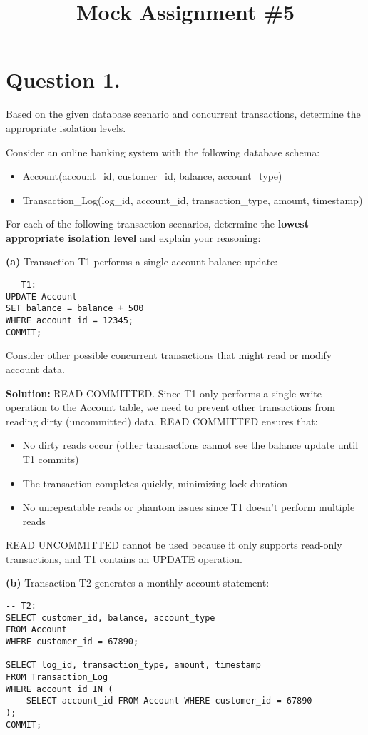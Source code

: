 \documentclass{article}
\title{Mock Assignment \#5}
\author{}
\date{}
\begin{document}
\maketitle

\section*{Question 1.}
Based on the given database scenario and concurrent transactions, determine the appropriate isolation levels.

Consider an online banking system with the following database schema:
\begin{itemize}
    \item Account(account\_id, customer\_id, balance, account\_type)
    \item Transaction\_Log(log\_id, account\_id, transaction\_type, amount, timestamp)
\end{itemize}

For each of the following transaction scenarios, determine the \textbf{lowest appropriate isolation level} and explain your reasoning:

\textbf{(a)} Transaction T1 performs a single account balance update:
\begin{verbatim}
-- T1:
UPDATE Account 
SET balance = balance + 500 
WHERE account_id = 12345;
COMMIT;
\end{verbatim}

Consider other possible concurrent transactions that might read or modify account data.

\textbf{Solution:}
READ COMMITTED. Since T1 only performs a single write operation to the Account table, we need to prevent other transactions from reading dirty (uncommitted) data. READ COMMITTED ensures that:
\begin{itemize}
    \item No dirty reads occur (other transactions cannot see the balance update until T1 commits)
    \item The transaction completes quickly, minimizing lock duration
    \item No unrepeatable reads or phantom issues since T1 doesn't perform multiple reads
\end{itemize}
READ UNCOMMITTED cannot be used because it only supports read-only transactions, and T1 contains an UPDATE operation.

\textbf{(b)} Transaction T2 generates a monthly account statement:
\begin{verbatim}
-- T2:
SELECT customer_id, balance, account_type 
FROM Account 
WHERE customer_id = 67890;

SELECT log_id, transaction_type, amount, timestamp 
FROM Transaction_Log 
WHERE account_id IN (
    SELECT account_id FROM Account WHERE customer_id = 67890
);
COMMIT;
\end{verbatim}
\end{document}
